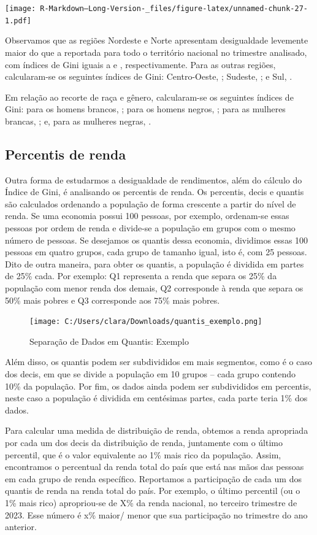 \documentclass[
]{article}
\begin{document}
\texttt{[image: R-Markdown--Long-Version-\_files/figure-latex/unnamed-chunk-27-1.pdf]}

Observamos que as regiões Nordeste e Norte apresentam desigualdade
levemente maior do que a reportada para todo o território nacional no
trimestre analisado, com índices de Gini iguais a e , respectivamente.
Para as outras regiões, calcularam-se os seguintes índices de Gini:
Centro-Oeste, ; Sudeste, ; e Sul, .

Em relação ao recorte de raça e gênero, calcularam-se os seguintes
índices de Gini: para os homens brancos, ; para os homens negros, ; para
as mulheres brancas, ; e, para as mulheres negras, .

\hypertarget{percentis-de-renda}{%
\subsection{Percentis de renda}\label{percentis-de-renda}}

Outra forma de estudarmos a desigualdade de rendimentos, além do cálculo
do Índice de Gini, é analisando os percentis de renda. Os percentis,
decis e quantis são calculados ordenando a população de forma crescente
a partir do nível de renda. Se uma economia possui 100 pessoas, por
exemplo, ordenam-se essas pessoas por ordem de renda e divide-se a
população em grupos com o mesmo número de pessoas. Se desejamos os
quantis dessa economia, dividimos essas 100 pessoas em quatro grupos,
cada grupo de tamanho igual, isto é, com 25 pessoas. Dito de outra
maneira, para obter os quantis, a população é dividida em partes de 25\%
cada. Por exemplo: Q1 representa a renda que separa os 25\% da população
com menor renda dos demais, Q2 corresponde à renda que separa os 50\%
mais pobres e Q3 corresponde aos 75\% mais pobres.

\begin{figure}
\centering
\texttt{[image: C:/Users/clara/Downloads/quantis\_exemplo.png]}
\caption{Separação de Dados em Quantis: Exemplo}
\end{figure}

Além disso, os quantis podem ser subdivididos em mais segmentos, como é
o caso dos decis, em que se divide a população em 10 grupos -- cada
grupo contendo 10\% da população. Por fim, os dados ainda podem ser
subdivididos em percentis, neste caso a população é dividida em
centésimas partes, cada parte teria 1\% dos dados.

Para calcular uma medida de distribuição de renda, obtemos a renda
apropriada por cada um dos decis da distribuição de renda, juntamente
com o último percentil, que é o valor equivalente ao 1\% mais rico da
população. Assim, encontramos o percentual da renda total do país que
está nas mãos das pessoas em cada grupo de renda específico. Reportamos
a participação de cada um dos quantis de renda na renda total do país.
Por exemplo, o último percentil (ou o 1\% mais rico) apropriou-se de X\%
da renda nacional, no terceiro trimestre de 2023. Esse número é x\%
maior/ menor que sua participação no trimestre do ano anterior.
\end{document}
